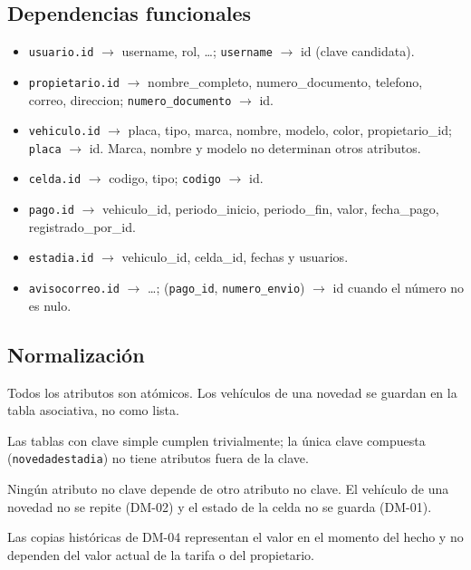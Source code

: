 \subsection{Dependencias funcionales}
\begin{itemize}
  \item \texttt{usuario.id} $\rightarrow$ username, rol, \ldots; \texttt{username} $\rightarrow$ id (clave candidata).
  \item \texttt{propietario.id} $\rightarrow$ nombre\_completo, numero\_documento, telefono, correo, direccion; \texttt{numero\_documento} $\rightarrow$ id.
  \item \texttt{vehiculo.id} $\rightarrow$ placa, tipo, marca, nombre, modelo, color, propietario\_id; \texttt{placa} $\rightarrow$ id. Marca, nombre y modelo no determinan otros atributos.
  \item \texttt{celda.id} $\rightarrow$ codigo, tipo; \texttt{codigo} $\rightarrow$ id.
  \item \texttt{pago.id} $\rightarrow$ vehiculo\_id, periodo\_inicio, periodo\_fin, valor, fecha\_pago, registrado\_por\_id.
  \item \texttt{estadia.id} $\rightarrow$ vehiculo\_id, celda\_id, fechas y usuarios.
  \item \texttt{avisocorreo.id} $\rightarrow$ \ldots; (\texttt{pago\_id}, \texttt{numero\_envio}) $\rightarrow$ id cuando el número no es nulo.
\end{itemize}

\subsection{Normalización}
\begin{description}[style=nextline]
  \item[1FN] Todos los atributos son atómicos. Los vehículos de una novedad se guardan en la tabla asociativa, no como lista.
  \item[2FN] Las tablas con clave simple cumplen trivialmente; la única clave compuesta (\texttt{novedadestadia}) no tiene atributos fuera de la clave.
  \item[3FN] Ningún atributo no clave depende de otro atributo no clave. El vehículo de una novedad no se repite (DM-02) y el estado de la celda no se guarda (DM-01).
  \item[Excepciones justificadas] Las copias históricas de DM-04 representan el valor en el momento del hecho y no dependen del valor actual de la tarifa o del propietario.
\end{description}

